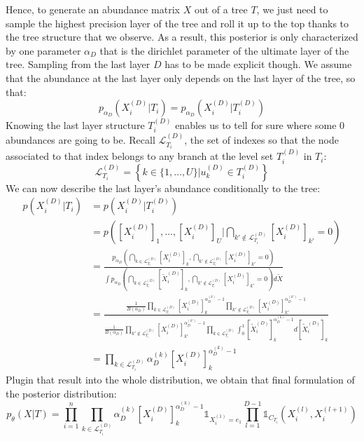 Hence, to generate an abundance matrix $X$ out of a tree $T$, we just need to sample the highest precision layer of the tree
and roll it up to the top thanks to the tree structure that we observe.
As a result, this posterior is only characterized by one parameter $\alpha_D$ that is the dirichlet parameter of the ultimate layer of the tree. Sampling from the last layer $D$ has to be made explicit though.
We assume that the abundance at the last layer only depends on the last layer of the tree, so that:
$$
p_{\alpha_D}(X_i^{(D)} | T_i) = p_{\alpha_D}(X_i^{(D)} | T_i^{(D)})
$$
\newcommand{\nodeindexset}{\mathcal{L}^{(D)}_{T_i}}
Knowing the last layer structure $T_i^{(D)}$ enables us to tell for sure where some $0$ abundances are going to be.
Recall $\nodeindexset$, the set of indexes so that the node associated to that index belongs to any branch at the level set $T_i^{(D)}$ in $T_i$:
$$
\nodeindexset = \left\{k \in \{1, \dots, U\} | u_k^{(D)} \in T_i^{(D)}\right\}
$$
We can now describe the last layer's abundance conditionally to the tree:
$$
\begin{align}
    p(X_i^{(D)} | T_i) &= p(X_i^{(D)} | T_i^{(D)}) \\
                                &= p\left(\left[X_i^{(D)}\right]_1, \dots, \left[X_i^{(D)}\right]_U | \bigcap_{k' \notin \nodeindexset} \left[X_i^{(D)}\right]_{k'} = 0\right) \\
                                &= \frac{p_{\alpha_D}\left( \bigcap_{k \in \nodeindexset} \left[X_i^{(D)}\right]_{k}, \bigcap_{k' \notin \nodeindexset} \left[X_i^{(D)}\right]_{k'} = 0 \right)}{\int p_{\alpha_D}\left( \bigcap_{k \in \nodeindexset} \left[\tilde{X}_i^{(D)}\right]_{k}, \bigcap_{k' \notin \nodeindexset} \left[X_i^{(D)}\right]_{k'} = 0 \right) d\tilde{X}} \\
                                &= \frac{\frac{1}{B(\alpha_D)} \prod_{k \in \nodeindexset} \left[X_i^{(D)}\right]_{k}^{\alpha_D^{(k)} - 1} \prod_{k' \notin \nodeindexset} \left[X_i^{(D)}\right]_{k'}^{\alpha_D^{(k')} - 1}}{\frac{1}{B(\alpha_D)} \prod_{k' \notin \nodeindexset} \left[X_i^{(D)}\right]_{k'}^{\alpha_D^{(k')} - 1} \prod_{k \in \nodeindexset} \int_{0}^{1} \left[\tilde{X}_i^{(D)}\right]_k^{\alpha_D^{(k)} - 1} d\left[\tilde{X}_i^{(D)}\right]_k} \\
                                &= \prod_{k \in \nodeindexset} \alpha_D^{(k)} \left[X_i^{(D)}\right]_k^{\alpha_D^{(k)} - 1}
\end{align}
$$
Plugin that result into the whole distribution, we obtain that final formulation of the posterior distribution:
$$
    p_{\theta}(X | T) = \prod_{i=1}^n \prod_{k \in \nodeindexset} \alpha_D^{(k)} \left[X_i^{(D)}\right]_k^{\alpha_D^{(k)} - 1} \mathds{1}_{X_i^{(1)} = e_1} \prod_{l=1}^{D-1} \mathds{1}_{C_{T_i}}(X_i^{(l)}, X_i^{(l+1)})
$$

